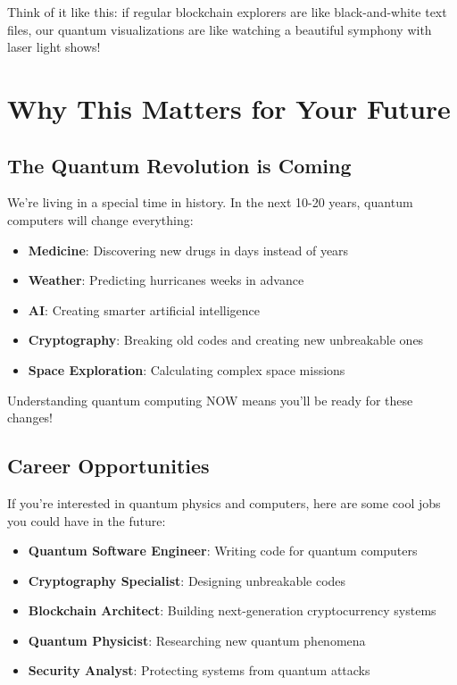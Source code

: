 \documentclass[11pt,a4paper]{article}
\begin{document}
Think of it like this: if regular blockchain explorers are like black-and-white text files, our quantum visualizations are like watching a beautiful symphony with laser light shows!

\section{Why This Matters for Your Future}

\subsection{The Quantum Revolution is Coming}

We're living in a special time in history. In the next 10-20 years, quantum computers will change everything:

\begin{itemize}
    \item \textbf{Medicine}: Discovering new drugs in days instead of years
    \item \textbf{Weather}: Predicting hurricanes weeks in advance
    \item \textbf{AI}: Creating smarter artificial intelligence
    \item \textbf{Cryptography}: Breaking old codes and creating new unbreakable ones
    \item \textbf{Space Exploration}: Calculating complex space missions
\end{itemize}

Understanding quantum computing NOW means you'll be ready for these changes!

\subsection{Career Opportunities}

If you're interested in quantum physics and computers, here are some cool jobs you could have in the future:

\begin{itemize}
    \item \textbf{Quantum Software Engineer}: Writing code for quantum computers
    \item \textbf{Cryptography Specialist}: Designing unbreakable codes
    \item \textbf{Blockchain Architect}: Building next-generation cryptocurrency systems
    \item \textbf{Quantum Physicist}: Researching new quantum phenomena
    \item \textbf{Security Analyst}: Protecting systems from quantum attacks
\end{itemize}
\end{document}
